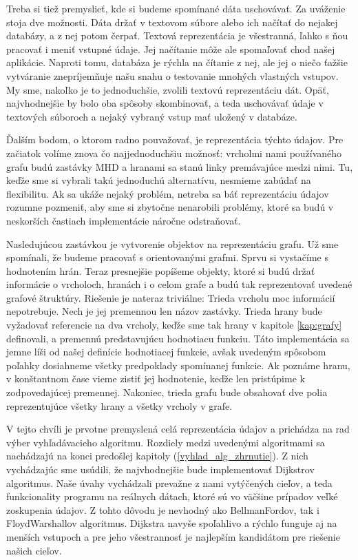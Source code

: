 Treba si tiež premyslieť, kde si budeme spomínané dáta uschovávať. Za uváženie stoja dve možnosti. Dáta držať v textovom súbore alebo ich načítať do nejakej databázy, a z nej potom čerpať. Textová reprezentácia je všestranná, ľahko s ňou pracovať i meniť vstupné údaje. Jej načítanie môže ale spomaľovať chod našej aplikácie. Naproti tomu, databáza je rýchla na čítanie z nej, ale jej o niečo ťažšie vytváranie znepríjemňuje našu snahu o testovanie mnohých vlastných vstupov. My sme, nakoľko je to jednoduchšie, zvolili textovú reprezentáciu dát. Opäť, najvhodnejšie by bolo oba spôsoby skombinovať, a teda uschovávať údaje v textových súboroch a nejaký vybraný vstup mať uložený v databáze.\newline

Ďalším bodom, o ktorom radno pouvažovať, je reprezentácia týchto údajov. Pre začiatok volíme znova čo najjednoduchšiu možnosť: vrcholmi nami používaného grafu budú zastávky MHD a hranami sa stanú linky premávajúce medzi nimi. Tu, keďže sme si vybrali takú jednoduchú alternatívu, nesmieme zabúdať na flexibilitu. Ak sa ukáže nejaký problém, netreba sa báť reprezentáciu údajov rozumne pozmeniť, aby sme si zbytočne nenarobili problémy, ktoré sa budú v neskorších častiach implementácie náročne odstraňovať.\newline

Nasledujúcou zastávkou je vytvorenie objektov na reprezentáciu grafu. Už sme spomínali, že budeme pracovať s orientovanými grafmi. Sprvu si vystačíme s hodnotením hrán. Teraz presnejšie popíšeme objekty, ktoré si budú držať informácie o vrcholoch, hranách i o celom grafe a budú tak reprezentovať uvedené grafové štruktúry. Riešenie je nateraz triviálne: Trieda vrcholu moc informácií nepotrebuje. Nech je jej premennou len názov zastávky. Trieda hrany bude vyžadovať referencie na dva vrcholy, keďže sme tak hrany v kapitole \ref{kap:grafy} definovali, a premennú predstavujúcu hodnotiacu funkciu. Táto implementácia sa jemne líši od našej definície hodnotiacej funkcie, avšak uvedeným spôsobom poľahky dosiahneme všetky predpoklady spomínanej funkcie. Ak poznáme hranu, v konštantnom čase vieme zistiť jej hodnotenie, keďže len pristúpime k zodpovedajúcej premennej. Nakoniec, trieda grafu bude obsahovať dve polia reprezentujúce všetky hrany a všetky vrcholy v grafe.\newline

V tejto chvíli je prvotne premyslená celá reprezentácia údajov a prichádza na rad výber vyhľadávacieho algoritmu. Rozdiely medzi uvedenými algoritmami sa nachádzajú na konci predošlej kapitoly (\ref{vyhlad_alg_zhrnutie}). Z nich vychádzajúc sme usúdili, že najvhodnejšie bude implementovať Dijkstrov algoritmus. Naše úvahy vychádzali prevažne z nami vytýčených cieľov, a teda funkcionality programu na reálnych dátach, ktoré sú vo väčšine prípadov veľké zoskupenia údajov. Z tohto dôvodu je nevhodný ako Bellman\textendash Fordov, tak i Floyd\textendash Warshallov algoritmus. Dijkstra navyše spoľahlivo a rýchlo funguje aj na menších vstupoch a pre jeho všestrannosť je najlepším kandidátom pre riešenie našich cieľov.\newline

